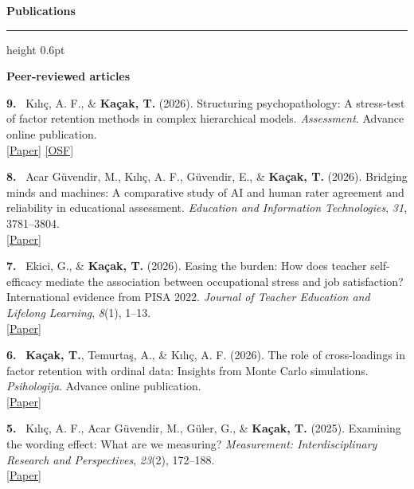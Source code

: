 \documentclass[10pt,a4paper]{article}
\newcommand{\me}[1]{\textbf{\color{headwhite}#1}}
\newcommand{\cvsection}[1]{%
  \vspace{10pt}%
  {\color{headwhite}\large\bfseries #1}\par
  \vspace{2pt}
  {\color{rulegray}\hrule height 0.6pt}
  \vspace{7pt}
}
\newcommand{\pubnum}[1]{\textbf{\color{headwhite}#1.}~}
\begin{document}
\cvsection{Publications}

{\color{headwhite}\bfseries\normalsize Peer-reviewed articles}
\vspace{4pt}

\pubnum{9} Kılıç, A. F., \& \me{Kaçak, T.} (2026). Structuring psychopathology: A stress-test of factor retention methods in complex hierarchical models. \textit{Assessment}. Advance online publication.\\
{\small \href{https://doi.org/10.1177/10731911261481399}{\color{linkblue}[Paper]} \href{https://osf.io/sufd3/overview?view_only=f9edc54d7a14447db5b7ab283f9a8927}{\color{linkblue}[OSF]}}
\vspace{6pt}

\pubnum{8} Acar G\"uvendir, M., Kılıç, A. F., G\"uvendir, E., \& \me{Kaçak, T.} (2026). Bridging minds and machines: A comparative study of AI and human rater agreement and reliability in educational assessment. \textit{Education and Information Technologies}, \textit{31}, 3781--3804.\\
{\small \href{https://doi.org/10.1007/s10639-026-13949-7}{\color{linkblue}[Paper]}}
\vspace{6pt}

\pubnum{7} Ekici, G., \& \me{Kaçak, T.} (2026). Easing the burden: How does teacher self-efficacy mediate the association between occupational stress and job satisfaction? International evidence from PISA 2022. \textit{Journal of Teacher Education and Lifelong Learning}, \textit{8}(1), 1--13.\\
{\small \href{https://doi.org/10.51535/tell.1776536}{\color{linkblue}[Paper]}}
\vspace{6pt}

\pubnum{6} \me{Kaçak, T.}, Temurtaş, A., \& Kılıç, A. F. (2026). The role of cross-loadings in factor retention with ordinal data: Insights from Monte Carlo simulations. \textit{Psihologija}. Advance online publication.\\
{\small \href{https://doi.org/10.2298/PSI250410050K}{\color{linkblue}[Paper]}}
\vspace{6pt}

\pubnum{5} Kılıç, A. F., Acar G\"uvendir, M., G\"uler, G., \& \me{Kaçak, T.} (2025). Examining the wording effect: What are we measuring? \textit{Measurement: Interdisciplinary Research and Perspectives}, \textit{23}(2), 172--188.\\
{\small \href{https://doi.org/10.1080/15366367.2024.2329505}{\color{linkblue}[Paper]}}
\vspace{6pt}
\end{document}
